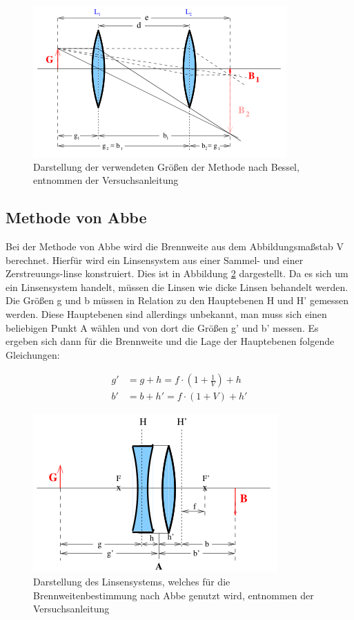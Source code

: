 \begin{figure}
  \centering
  \includegraphics[scale=0.7]{images/Bessel.png}
  \caption{Darstellung der verwendeten Größen der Methode nach Bessel, entnommen der Versuchsanleitung \cite[4]{sample}}
  \label{fig:Bessel}
\end{figure}

\subsection{Methode von Abbe}

Bei der Methode von Abbe wird die Brennweite aus dem Abbildungsmaßstab V berechnet.
Hierfür wird ein Linsensystem aus einer Sammel- und einer Zerstreuungs-linse konstruiert.
Dies ist in Abbildung \ref{fig:Abbe} dargestellt.
Da es sich um ein Linsensystem handelt, müssen die Linsen wie dicke Linsen behandelt werden.
Die Größen g und b müssen in Relation zu den Hauptebenen H und H' gemessen werden.
Diese Hauptebenen sind allerdings unbekannt, man muss sich einen beliebigen Punkt A wählen und von dort die Größen g' und b' messen.
Es ergeben sich dann für die Brennweite und die Lage der Hauptebenen folgende Gleichungen:

\begin{align}
  g' &= g + h  = f \cdot \left(1 + \frac{1}{V} \right) + h  \label{eqn:Abbe1}\\
  b' &= b + h' = f \cdot (1 + V) + h'   \label{eqn:Abbe2}
\end{align}

\begin{figure}
  \centering
  \includegraphics[scale=0.7]{images/Abbe.png}
  \caption{Darstellung des Linsensystems, welches für die Brennweitenbestimmung nach Abbe genutzt wird, entnommen der Versuchsanleitung \cite[5]{sample}}
  \label{fig:Abbe}
\end{figure}
